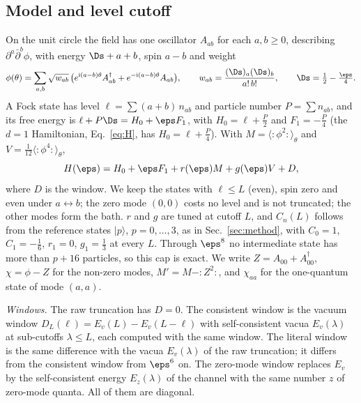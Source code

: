 \subsection{Model and level cutoff}\label{d2:model}
On the unit circle the field has one oscillator $A_{ab}$ for each $a,b\ge0$, describing $\partial^a\bar\partial^b\phi$, with
energy $\Ds+a+b$, spin $a-b$ and weight
\begin{equation}
 \phi(\theta)=\sum_{a,b}\sqrt{w_{ab}}\,\big(e^{\mathrm i(a-b)\theta}A^\dagger_{ab}+e^{-\mathrm i(a-b)\theta}A_{ab}\big),\qquad
 w_{ab}=\frac{(\Ds)_a(\Ds)_b}{a!\,b!},\qquad \Ds=\tfrac12-\tfrac\eps4 .
 \label{d2:eq:modes}
\end{equation}
A Fock state has level $\ell=\sum(a+b)\,n_{ab}$ and particle number $P=\sum n_{ab}$, and its free energy is
$\ell+P\Ds=H_0+\eps F_1$, with $H_0=\ell+\frac P2$ and $F_1=-\frac P4$ (the $d=1$ Hamiltonian, Eq.~\eqref{eq:H}, has $H_0=\ell+\frac P4$). With
$M=\langle{:}\phi^2{:}\rangle_\theta$ and $V=\frac1{12}\langle{:}\phi^4{:}\rangle_\theta$,
\begin{equation}
 H(\eps)=H_0+\eps F_1+r(\eps)M+g(\eps)V+D ,
 \label{d2:eq:H}
\end{equation}
where $D$ is the window. We keep the states with $\ell\le L$ (even), spin zero and even under $a\leftrightarrow b$; the zero mode
$(0,0)$ costs no level and is not truncated; the other modes form the bath. $r$ and $g$ are tuned at cutoff $L$, and $C_n(L)$ follows from the reference
states $|p\rangle$, $p=0,\dots,3$, as in Sec.~\ref{sec:method}, with $C_0=1$, $C_1=-\frac16$, $r_1=0$, $g_1=\frac13$ at every $L$.
Through $\eps^8$ no intermediate state has more than $p+16$ particles, so this cap is exact. We write $Z=A_{00}+A_{00}^\dagger$,
$\chi=\phi-Z$ for the non-zero modes, $M'=M-{:}Z^2{:}$, and $\chi_{aa}$ for the one-quantum state of mode $(a,a)$.

\emph{Windows.} The raw truncation has $D=0$. The consistent window is the vacuum window
$D_L(\ell)=E_v(L)-E_v(L-\ell)$ with self-consistent vacua $E_v(\lambda)$ at sub-cutoffs $\lambda\le L$, each computed
with the same window. The literal window is the same difference with the vacua $E_v(\lambda)$ of the raw truncation; it
differs from the consistent window from $\eps^6$ on. The zero-mode window replaces $E_v$ by the self-consistent energy
$E_z(\lambda)$ of the channel with the same number $z$ of zero-mode quanta. All of them are diagonal.

